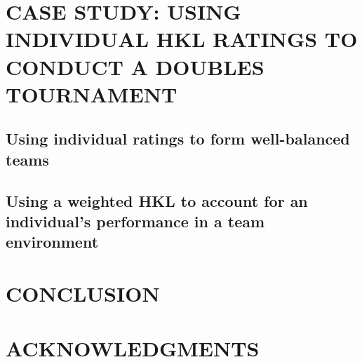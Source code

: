 \documentclass[letterpaper, 10 pt, conference]{ieeeconf}  %
\begin{document}
\section{CASE STUDY: USING INDIVIDUAL HKL RATINGS TO CONDUCT A DOUBLES TOURNAMENT}
\subsection{Using individual ratings to form well-balanced teams}
\subsection{Using a weighted HKL to account for an individual's performance in a team environment} 


\section{CONCLUSION}

\section*{ACKNOWLEDGMENTS}


% 

\end{document}
